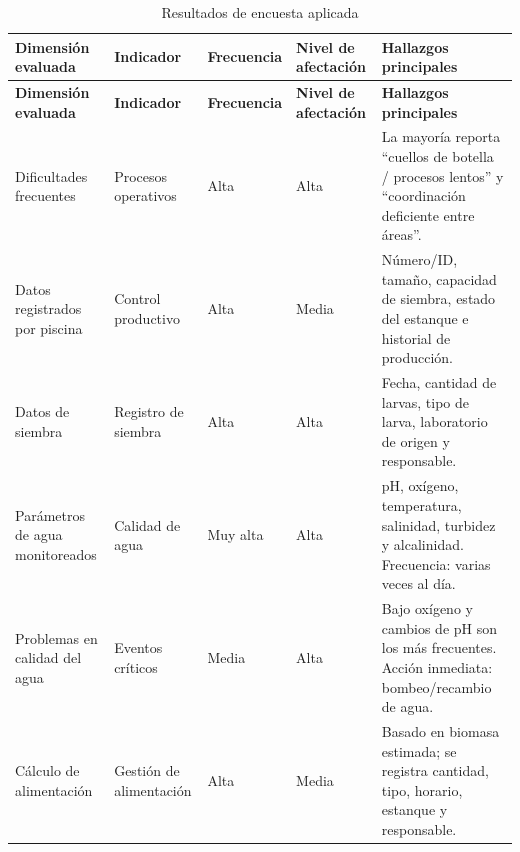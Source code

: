 \documentclass[11pt,a4paper]{article}
\begin{document}
\begin{longtable}{
|p{3.2cm}|
p{2.1cm}|
p{2cm}|
p{2.8cm}|
p{5.2cm}|
}
\caption{Resultados de encuesta aplicada}
\label{tab:resultados_encuesta}

\hline

\textbf{Dimensión evaluada} &
\textbf{Indicador} &
\textbf{Frecuencia} &
\textbf{Nivel de afectación} &
\textbf{Hallazgos principales} \\
\hline
\endfirsthead

\hline

\textbf{Dimensión evaluada} &
\textbf{Indicador} &
\textbf{Frecuencia} &
\textbf{Nivel de afectación} &
\textbf{Hallazgos principales} \\
\hline
\endhead

\raggedright\arraybackslash Dificultades frecuentes &
\raggedright\arraybackslash Procesos operativos &
Alta &
Alta &
La mayoría reporta ``cuellos de botella / procesos lentos'' y ``coordinación deficiente entre áreas''. \\
\hline

\raggedright\arraybackslash Datos registrados por piscina &
\raggedright\arraybackslash Control productivo &
Alta &
Media &
Número/ID, tamaño, capacidad de siembra, estado del estanque e historial de producción. \\
\hline

\raggedright\arraybackslash Datos de siembra &
\raggedright\arraybackslash Registro de siembra &
Alta &
Alta &
Fecha, cantidad de larvas, tipo de larva, laboratorio de origen y responsable. \\
\hline

\raggedright\arraybackslash Parámetros de agua monitoreados &
\raggedright\arraybackslash Calidad de agua &
Muy alta &
Alta &
pH, oxígeno, temperatura, salinidad, turbidez y alcalinidad. Frecuencia: varias veces al día. \\
\hline

\raggedright\arraybackslash Problemas en calidad del agua &
\raggedright\arraybackslash Eventos críticos &
Media &
Alta &
Bajo oxígeno y cambios de pH son los más frecuentes. Acción inmediata: bombeo/recambio de agua. \\
\hline

\raggedright\arraybackslash Cálculo de alimentación &
\raggedright\arraybackslash Gestión de alimentación &
Alta &
Media &
Basado en biomasa estimada; se registra cantidad, tipo, horario, estanque y responsable. \\
\hline


\end{longtable}
\end{document}
